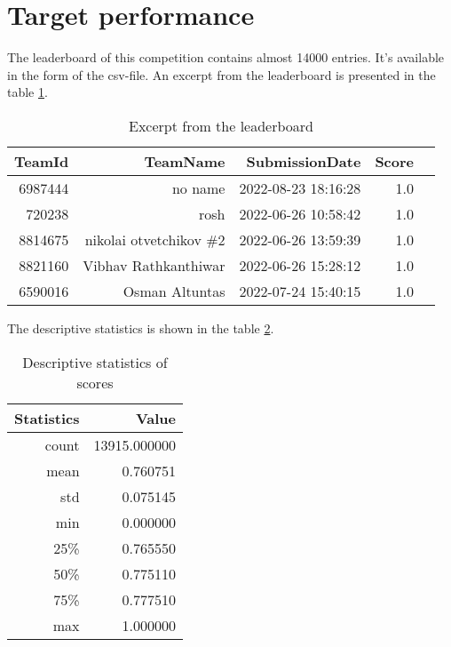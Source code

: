 \section{Target performance}
The leaderboard of this competition contains almost 14000 entries. It's
available in the form of the csv-file. An excerpt from the leaderboard 
is presented in the table \ref{table:excert_from_leaderboard}.

\begin{table}[!ht]
	\centering
	\caption{Excerpt from the leaderboard}
	\begin{tabular}{|r|r|r|r|r|}
		\hline
		\textbf{TeamId} & \textbf{TeamName}       & \textbf{SubmissionDate} & \textbf{Score} \\ \hline
		6987444         & no name                 & 2022-08-23 18:16:28     & 1.0            \\ \hline
		720238          & rosh                    & 2022-06-26 10:58:42     & 1.0            \\ \hline
		8814675         & nikolai otvetchikov \#2 & 2022-06-26 13:59:39     & 1.0            \\ \hline
		8821160         & Vibhav Rathkanthiwar    & 2022-06-26 15:28:12     & 1.0            \\ \hline
		6590016         & Osman Altuntas          & 2022-07-24 15:40:15     & 1.0            \\ \hline
	\end{tabular}
	\label{table:excert_from_leaderboard}
\end{table}

The descriptive statistics is shown in the table
\ref{table:scores_statistics}.

\begin{table}[!ht]
	\centering
	\caption{Descriptive statistics of scores}
	\begin{tabular}{|r|r|}
	\hline
		\textbf{Statistics} & \textbf{Value}        \\ \hline
		count               & 13915.000000          \\ \hline
		mean                & 0.760751              \\ \hline
		std                 & 0.075145              \\ \hline
		min                 & 0.000000              \\ \hline
		25\%                & 0.765550              \\ \hline
		50\%                & 0.775110              \\ \hline
		75\%                & 0.777510              \\ \hline
		max                 & 1.000000              \\ \hline
	\end{tabular}
	\label{table:scores_statistics}
\end{table}

